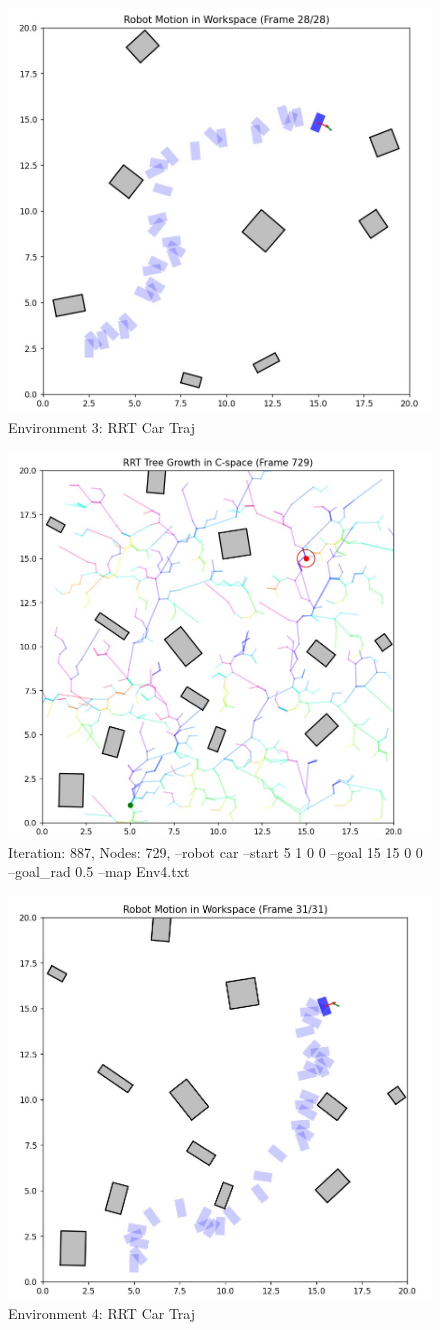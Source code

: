 \documentclass{article}
\begin{document}
\begin{figure} [H]
    \centering
    \includegraphics[width=0.5\linewidth]{latex_media/Env3Car_rrt_traj.jpg}
    \caption{Environment 3: RRT Car Traj}
\end{figure}

\begin{figure} [H]
    \centering
    \includegraphics[width=0.5\linewidth]{latex_media/Env4Car_rrt_grow.jpg}
    \caption{Iteration: 887, Nodes: 729,  --robot car --start 5 1 0 0 --goal 15 15 0 0 --goal\_rad 0.5 --map Env4.txt}
\end{figure}

\begin{figure} [H]
    \centering
    \includegraphics[width=0.5\linewidth]{latex_media/Env4Car_rrt_traj.jpg}
    \caption{Environment 4: RRT Car Traj}
\end{figure}
\end{document}
